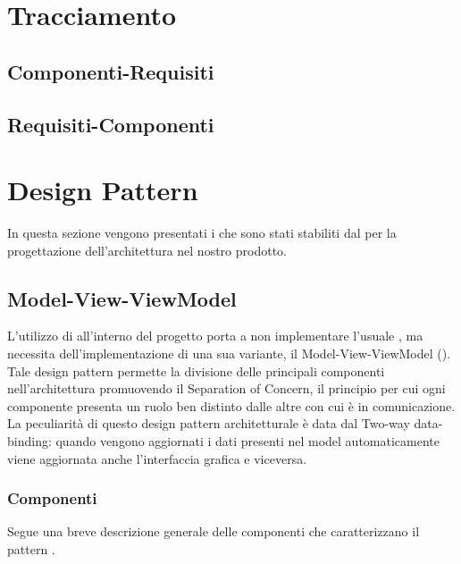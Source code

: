 \documentclass[a4paper, titlepage]{article}
\begin{document}
\section{Tracciamento}

\subsection{Componenti-Requisiti}


\subsection{Requisiti-Componenti}



\newpage
\appendix
\section{Design Pattern}
In questa sezione vengono presentati i  che sono stati stabiliti dal  per la progettazione dell'architettura nel nostro prodotto.

\subsection{Model-View-ViewModel}
L'utilizzo di  all'interno del progetto porta a non implementare l'usuale  , ma necessita dell'implementazione di una sua variante, il Model-View-ViewModel ().
\\Tale design pattern permette la divisione delle principali componenti nell'architettura promuovendo il Separation of Concern, il principio per cui ogni componente presenta un ruolo ben distinto dalle altre con cui è in comunicazione.
\\La peculiarità di questo design pattern architetturale è data dal Two-way data-binding: quando vengono aggiornati i dati presenti nel model automaticamente viene aggiornata anche l'interfaccia grafica e viceversa.

\subsubsection{Componenti}
Segue una breve descrizione generale delle componenti che caratterizzano il pattern .
\end{document}
